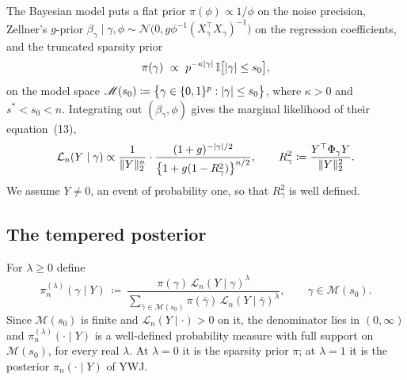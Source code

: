 \documentclass[aos]{imsart}
\DeclarePairedDelimiter{\norm}{\lVert}{\rVert}
\DeclarePairedDelimiter{\abs}{\lvert}{\rvert}
\newcommand{\calN}[0]{\mathcal{N}}
\newcommand{\Ind}[0]{\mathbb{I}}
\theoremstyle{plain}
\theoremstyle{definition}
\begin{document}
    The Bayesian model puts a flat prior $\pi(\phi)\propto1/\phi$ on the noise
    precision, Zellner's $g$-prior $\beta_\gamma\mid
    \gamma,\phi\sim\calN\bigl(0,g\phi^{-1}(X_\gamma^{\top}
    X_\gamma)^{-1}\bigr)$ on the regression coefficients, and the truncated
    sparsity prior
    \begin{equation}
        \label{eq:prior}
        \pi(\gamma)\ \propto\ p^{-\kappa\abs{\gamma}}\,
        \Ind\bigl[\abs{\gamma}\leq s_0\bigr],
    \end{equation}
    on the model space $
    \mathscr{M}(s_0)\coloneq\bigl\{\gamma\in\{0,1\}^{p}:
    \abs{\gamma}\leq s_0\bigr\}$,
    where $\kappa>0$ and $s^\ast<s_0<n$. Integrating out
    $(\beta_\gamma,\phi)$ gives the marginal likelihood of their
    equation~(13),
    \begin{equation}
        \label{eq:Lik}
        \mathcal{L}_n(Y\mid\gamma)
        \propto \frac{1}{\norm Y_2^{n}} \cdot %
        \frac{(1+g)^{-\abs{\gamma}/2}}
        {\bigl\{1+g(1-R_\gamma^{2})\bigr\}^{n/2}},
        \qquad
        R^{2}_\gamma\coloneq
        \frac{Y^{\top}\Phi_\gamma Y}{\norm Y_2^{2}}.
    \end{equation}
    We assume $Y\neq0$, an event of probability one, so that
    $R_\gamma^{2}$ is well defined.

    \subsection{The tempered posterior}
    \label{sub:tempered}

    For $\lambda\geq0$ define
    \begin{equation}
        \label{eq:pilambda}
        \pi_n^{(\lambda)}(\gamma\mid Y)
        \ \coloneq\ \frac{\pi(\gamma)\,
        \mathcal{L}_n(Y\mid\gamma)^{\lambda}}
        {\sum_{\bar\gamma\in\mathscr{M}(s_0)}\pi(\bar\gamma)\,
        \mathcal{L}_n(Y\mid\bar\gamma)^{\lambda}} ,
        \qquad \gamma\in\mathscr{M}(s_0) .
    \end{equation}
    Since $\mathscr{M}(s_0)$ is finite and
    $\mathcal{L}_n(Y\mid\cdot)>0$ on it, the denominator lies in
    $(0,\infty)$ and $\pi_n^{(\lambda)}(\cdot\mid Y)$ is a well-defined
    probability measure with full support on $\mathscr{M}(s_0)$, for every
    real $\lambda$. At $\lambda=0$ it is the sparsity prior $\pi$; at
    $\lambda=1$ it is the posterior $\pi_n(\cdot\mid Y)$ of YWJ.
\end{document}
